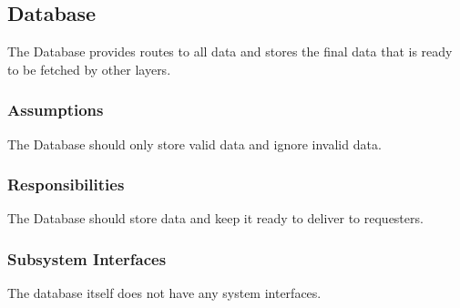 \subsection{Database}
The Database provides routes to all data and stores the final data that is ready to be fetched by other layers.

\subsubsection{Assumptions}
The Database should only store valid data and ignore invalid data.

\subsubsection{Responsibilities}
The Database should store data and keep it ready to deliver to requesters.

\subsubsection{Subsystem Interfaces}
The database itself does not have any system interfaces.